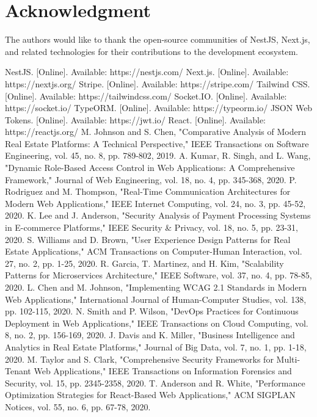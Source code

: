 \documentclass[conference]{IEEEtran}
\begin{document}
\section*{Acknowledgment}
The authors would like to thank the open-source communities of NestJS, Next.js, and related technologies for their contributions to the development ecosystem.

\begin{thebibliography}{1}
 NestJS. [Online]. Available: https://nestjs.com/
 Next.js. [Online]. Available: https://nextjs.org/
 Stripe. [Online]. Available: https://stripe.com/
 Tailwind CSS. [Online]. Available: https://tailwindcss.com/
 Socket.IO. [Online]. Available: https://socket.io/
 TypeORM. [Online]. Available: https://typeorm.io/
 JSON Web Tokens. [Online]. Available: https://jwt.io/
 React. [Online]. Available: https://reactjs.org/
 M. Johnson and S. Chen, "Comparative Analysis of Modern Real Estate Platforms: A Technical Perspective," IEEE Transactions on Software Engineering, vol. 45, no. 8, pp. 789-802, 2019.
 A. Kumar, R. Singh, and L. Wang, "Dynamic Role-Based Access Control in Web Applications: A Comprehensive Framework," Journal of Web Engineering, vol. 18, no. 4, pp. 345-368, 2020.
 P. Rodriguez and M. Thompson, "Real-Time Communication Architectures for Modern Web Applications," IEEE Internet Computing, vol. 24, no. 3, pp. 45-52, 2020.
 K. Lee and J. Anderson, "Security Analysis of Payment Processing Systems in E-commerce Platforms," IEEE Security & Privacy, vol. 18, no. 5, pp. 23-31, 2020.
 S. Williams and D. Brown, "User Experience Design Patterns for Real Estate Applications," ACM Transactions on Computer-Human Interaction, vol. 27, no. 2, pp. 1-25, 2020.
 R. Garcia, T. Martinez, and H. Kim, "Scalability Patterns for Microservices Architecture," IEEE Software, vol. 37, no. 4, pp. 78-85, 2020.
 L. Chen and M. Johnson, "Implementing WCAG 2.1 Standards in Modern Web Applications," International Journal of Human-Computer Studies, vol. 138, pp. 102-115, 2020.
 N. Smith and P. Wilson, "DevOps Practices for Continuous Deployment in Web Applications," IEEE Transactions on Cloud Computing, vol. 8, no. 2, pp. 156-169, 2020.
 J. Davis and K. Miller, "Business Intelligence and Analytics in Real Estate Platforms," Journal of Big Data, vol. 7, no. 1, pp. 1-18, 2020.
 M. Taylor and S. Clark, "Comprehensive Security Frameworks for Multi-Tenant Web Applications," IEEE Transactions on Information Forensics and Security, vol. 15, pp. 2345-2358, 2020.
 T. Anderson and R. White, "Performance Optimization Strategies for React-Based Web Applications," ACM SIGPLAN Notices, vol. 55, no. 6, pp. 67-78, 2020.
\end{thebibliography}
\end{document}
